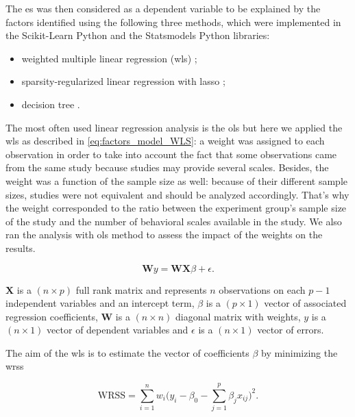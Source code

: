 The \gls{es} was then considered as a dependent variable to be explained by the factors identified using the following three methods, which were 
implemented in the Scikit-Learn Python \citep[0.18.1]{Pedregosa2011} and the Statsmodels Python \citep[0.8.0]{Seabold2010} libraries:
\begin{itemize}
	\item weighted multiple linear regression (\gls{wls}) \citep{Montgomery2012}; 
	\item sparsity-regularized linear regression with \gls{lasso} \citep{Tibshirani1996};
	\item decision tree \citep{Quinlan1986}.
\end{itemize}

The most often used linear regression analysis is the \gls{ols} but here we applied the \gls{wls} as described in \cref{eq:factors_model_WLS}: a 
weight was assigned to each observation in order to take into account the fact that some observations came from the same study because studies 
may provide several scales. Besides, the weight was a function of the sample size as well: because of their different sample sizes,
studies were not equivalent and should be analyzed accordingly. That's why the weight corresponded to the ratio between the experiment group's sample size of the study and 
the number of behavioral scales available in the study. We also ran the analysis with \gls{ols} method to assess the impact of the weights on the results. 

\begin{equation}
\label{eq:factors_model_WLS}
\textbf{W}y = \textbf{WX}\beta + \epsilon.
\end{equation}

$\textbf{X}$ is a $(n \times p)$ full rank matrix and represents $n$ observations on each $p-1$ independent variables and an 
intercept term, $\beta$ is a $(p \times 1)$ vector of associated regression coefficients, $\textbf{W}$ is a $(n \times n)$ diagonal 
matrix with weights, $y$ is a $(n \times 1)$ vector of dependent variables and $\epsilon$ is a $(n \times 1)$ vector of errors.

The aim of the \gls{wls} is to estimate the vector of coefficients $\beta$ by minimizing the \gls{wrss}

\begin{equation}
\label{eq:factors_WRSS}
\text{WRSS} = \sum_{i=1}^{n} w_i \Big(y_i - \beta_{0} - \sum_{j=1}^{p}\beta_{j}x_{ij}\Big)^2.
\end{equation}

